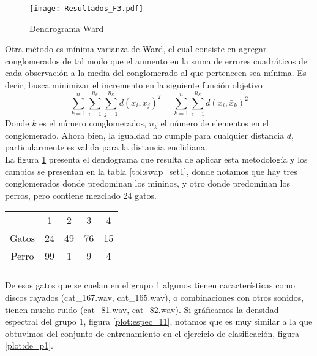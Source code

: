 \documentclass[twocolumn,10pt]{asme2ej}
\begin{document}
\begin{figure}[h]
  \centering
    \texttt{[image: Resultados\_F3.pdf]}
  \caption{Dendrograma Ward}
  \label{plot:dendro_ward}
\end{figure}
Otra m\'etodo es m\'inima varianza de Ward, el cual consiste en agregar conglomerados de tal modo que el aumento en la suma de errores cuadr\'aticos de cada observaci\'on a la media del conglomerado al que pertenecen sea m\'inima. Es decir, busca minimizar el incremento en la siguiente funci\'on objetivo
$$\sum_{k=1}^{n}\sum_{i=1}^{n_k}\sum_{j=1}^{n_k}d(x_i,x_j)^2=\sum_{k=1}^{n}\sum_{i=1}^{n_k}d(x_i,\bar{x}_k)^2$$
Donde $k$ es el n\'umero conglomerados, $n_k$ el n\'umero de elementos en el conglomerado. Ahora bien, la igualdad no cumple para cualquier distancia $d$, particularmente es valida para la distancia euclidiana.\\

La figura \ref{plot:dendro_ward} presenta el dendograma que resulta de aplicar esta metodolog\'ia y los cambios se presentan en la tabla \ref{tbl:swap_set1}, donde notamos que hay tres conglomerados donde predominan los mininos, y otro donde predominan los perros, pero contiene mezclado 24 gatos.\\

\begin{tabular}{ccccc}
 & 1 & 2 & 3 & 4\\
 Gatos & 24& 49 & 76 & 15\\
Perro & 99 & 1 & 9 & 4\\
\label{tbl:swap_set1}
\end{tabular}

De esos gatos que se cuelan en el grupo 1 algunos tienen caracter\'isticas como discos rayados (cat\_167.wav, cat\_165.wav), o combinaciones con otros sonidos, tienen mucho ruido (cat\_81.wav, cat\_82.wav). Si gr\'aficamos la densidad espectral del grupo 1, figura \ref{plot:espec_11}, notamos que es muy similar a la que obtuvimos del conjunto de entrenamiento en el ejercicio de clasificaci\'on, figura \ref{plot:de_p1}. \\
\end{document}
